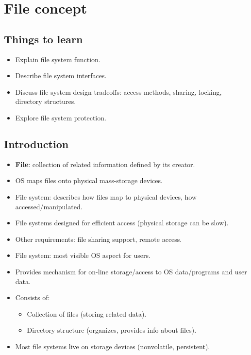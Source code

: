 \section{File concept}

\subsection*{Things to learn}
\begin{itemize}
    \item Explain file system function.
    \item Describe file system interfaces.
    \item Discuss file system design tradeoffs: access methods, sharing, locking, directory structures.
    \item Explore file system protection.
\end{itemize}

\subsection*{Introduction}
\begin{itemize}
    \item \textbf{File}: collection of related information defined by its creator.
    \item OS maps files onto physical mass-storage devices.
    \item File system: describes how files map to physical devices, how accessed/manipulated.
    \item File systems designed for efficient access (physical storage can be slow).
    \item Other requirements: file sharing support, remote access.
    \item File system: most visible OS aspect for users.
    \item Provides mechanism for on-line storage/access to OS data/programs and user data.
    \item Consists of:
    \begin{itemize}
        \item Collection of files (storing related data).
        \item Directory structure (organizes, provides info about files).
    \end{itemize}
    \item Most file systems live on storage devices (nonvolatile, persistent).
\end{itemize}

